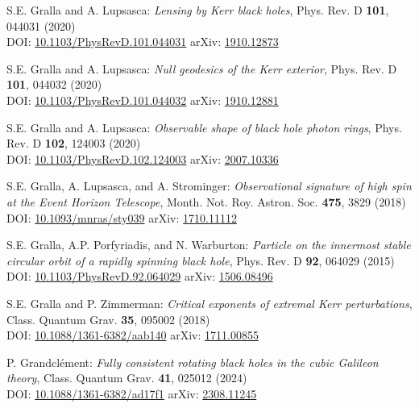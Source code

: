 \begin{thebibliography}{123}
S.E. Gralla and A. Lupsasca:
{\em Lensing by Kerr black holes},
Phys. Rev. D {\bf 101}, 044031 (2020)\\
DOI: \href{https://doi.org/10.1103/PhysRevD.101.044031}{10.1103/PhysRevD.101.044031}\hfill
arXiv: \href{https://arxiv.org/abs/1910.12873}{1910.12873}

S.E. Gralla and A. Lupsasca:
{\em Null geodesics of the Kerr exterior},
Phys. Rev. D {\bf 101}, 044032 (2020)\\
DOI: \href{https://doi.org/10.1103/PhysRevD.101.044032}{10.1103/PhysRevD.101.044032}\hfill
arXiv: \href{https://arxiv.org/abs/1910.12881}{1910.12881}

S.E. Gralla and A. Lupsasca:
{\em Observable shape of black hole photon rings},
Phys. Rev. D {\bf 102}, 124003 (2020)\\
DOI: \href{https://doi.org/10.1103/PhysRevD.102.124003}{10.1103/PhysRevD.102.124003}\hfill
arXiv: \href{https://arxiv.org/abs/2007.10336}{2007.10336}

S.E. Gralla, A. Lupsasca, and A. Strominger:
{\em Observational signature of high spin at the Event Horizon Telescope},
Month. Not. Roy. Astron. Soc. {\bf 475}, 3829 (2018)\\
DOI: \href{https://doi.org/10.1093/mnras/sty039}{10.1093/mnras/sty039}\hfill
arXiv: \href{https://arxiv.org/abs/1710.11112}{1710.11112}

S.E. Gralla, A.P. Porfyriadis, and N. Warburton:
{\em Particle on the innermost stable circular orbit of a rapidly spinning black hole},
Phys. Rev. D {\bf 92}, 064029 (2015)\\
DOI: \href{https://doi.org/10.1103/PhysRevD.92.064029}{10.1103/PhysRevD.92.064029}\hfill
arXiv: \href{https://arxiv.org/abs/1506.08496}{1506.08496}

S.E. Gralla and P. Zimmerman:
{\em Critical exponents of extremal Kerr perturbations},
Class. Quantum Grav. {\bf 35}, 095002 (2018)\\
DOI: \href{https://doi.org/10.1088/1361-6382/aab140}{10.1088/1361-6382/aab140}\hfill
arXiv: \href{https://arxiv.org/abs/1711.00855}{1711.00855}

P. Grandclément:
{\em Fully consistent rotating black holes in the cubic Galileon theory},
Class. Quantum Grav. {\bf 41}, 025012 (2024)\\
DOI: \href{https://doi.org/10.1088/1361-6382/ad17f1}{10.1088/1361-6382/ad17f1}\hfill
arXiv: \href{https://arxiv.org/abs/2308.11245}{2308.11245}


\end{thebibliography}
